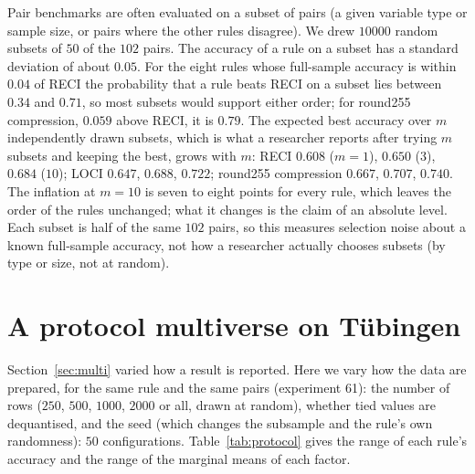 Pair benchmarks are often evaluated on a subset of pairs (a given variable type or sample size, or pairs where the other rules disagree). We drew $10000$ random subsets of $50$ of the $102$ pairs. The accuracy of a rule on a subset has a standard deviation of about $0.05$. For the eight rules whose full-sample accuracy is within $0.04$ of RECI the probability that a rule beats RECI on a subset lies between $0.34$ and $0.71$, so most subsets would support either order; for round255 compression, $0.059$ above RECI, it is $0.79$. The expected best accuracy over $m$ independently drawn subsets, which is what a researcher reports after trying $m$ subsets and keeping the best, grows with $m$: RECI $0.608$ ($m=1$), $0.650$ ($3$), $0.684$ ($10$); LOCI $0.647$, $0.688$, $0.722$; round255 compression $0.667$, $0.707$, $0.740$. The inflation at $m=10$ is seven to eight points for every rule, which leaves the order of the rules unchanged; what it changes is the claim of an absolute level. Each subset is half of the same $102$ pairs, so this measures selection noise about a known full-sample accuracy, not how a researcher actually chooses subsets (by type or size, not at random).

\section{A protocol multiverse on T\"ubingen}\label{sec:protocol_multiverse}

Section~\ref{sec:multi} varied how a result is reported. Here we vary how the data are prepared, for the same rule and the same pairs (experiment 61): the number of rows ($250$, $500$, $1000$, $2000$ or all, drawn at random), whether tied values are dequantised, and the seed (which changes the subsample and the rule's own randomness): $50$ configurations. Table~\ref{tab:protocol} gives the range of each rule's accuracy and the range of the marginal means of each factor.

